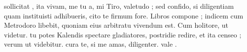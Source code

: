 


sollicitat , ita vivam, me tu a, mi Tiro, valetudo ; sed confido, si diligentiam quam instituisti adhibueris, cito te firmum fore.  Libros compone ; indicem cum Metrodoro
libebit, quoniam eius arbitratu vivendum est. Cum holitore, ut videtur. tu potes Kalendis spectare gladiatores, postridie redire, et ita censeo ; verum ut videbitur. cura te, si me amas, diligenter. vale .
